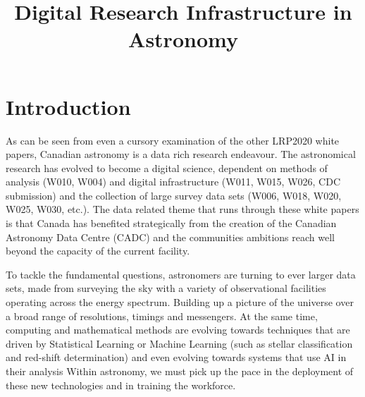 \documentclass[11pt]{article}
\begin{document}

%
\setlength{\bibsep}{0.0pt}

\title{Digital Research Infrastructure in Astronomy}
\maketitle
\section{Introduction}

As can be seen from even a cursory examination of the other LRP2020 white papers, Canadian astronomy is a data rich research endeavour.  The astronomical research has evolved to become a digital science, dependent on methods of analysis (W010, W004) and digital infrastructure (W011, W015, W026, CDC submission) and the collection of large survey data sets (W006, W018, W020, W025, W030, etc.).  The data related theme that runs through these white papers is that Canada has benefited strategically from the creation of the Canadian Astronomy Data Centre (CADC) and the communities ambitions reach well beyond the capacity of the current facility. 

To tackle the fundamental questions, astronomers are turning to ever larger data sets, made from surveying the sky with a variety of observational facilities operating across the energy spectrum. Building up a picture of the universe over a broad range of resolutions, timings and messengers.  At the same time, computing and mathematical methods are evolving towards techniques that are driven by Statistical Learning or Machine Learning (such as stellar classification and red-shift determination) and even evolving towards systems that use AI in their analysis  Within astronomy, we must pick up the pace in the deployment of these new technologies and in training the workforce.
\end{document}

